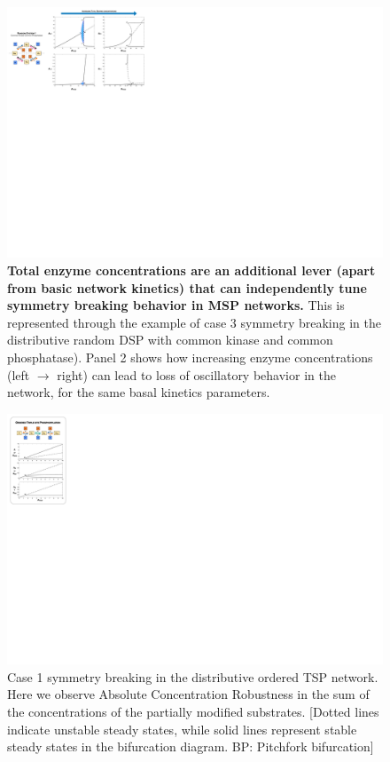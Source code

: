 \documentclass[9pt,lineno]{elife}
\begin{document}
\clearpage
\begin{figure}[ht!]
    \centering
    \includegraphics[width = 0.9\linewidth, height = 0.7\paperheight, keepaspectratio]{FigS07.pdf}
    \caption{\textbf{Total enzyme concentrations are an additional lever (apart from basic network kinetics) that can independently tune symmetry breaking behavior in MSP networks.} This is represented through the example of case 3 symmetry breaking in the distributive random DSP with common kinase and common phosphatase). Panel 2 shows how increasing enzyme concentrations (left $\longrightarrow$ right) can lead to loss of oscillatory behavior in the network, for the same basal kinetics parameters.}
    \label{Fig S7}
\end{figure}

\clearpage
\begin{figure}
    \centering
    \includegraphics[width=0.9\linewidth, height = 0.75\paperheight, keepaspectratio]{FigS08.pdf}
    \caption{Case 1 symmetry breaking in the distributive ordered TSP network. Here we observe Absolute Concentration Robustness in the sum of the concentrations of the partially modified substrates. [Dotted lines indicate unstable steady states, while solid lines represent stable steady states in the bifurcation diagram. BP: Pitchfork bifurcation]}
    \label{Fig S8}
\end{figure}
\end{document}
